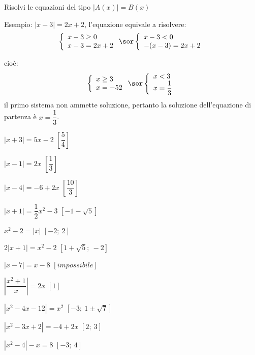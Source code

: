 \begin{esercizio}\label{ese:03.1}
\noindent Risolvi le equazioni del tipo \(|A(x)|=B(x)\)

Esempio:
\(|x-3|=2x+2\), l'equazione equivale a risolvere:
\[
\left\lbrace 
\begin{array}{l}
x-3\geq 0 \\
x-3=2x+2\\
\end{array}
\right.
\sor
\left\lbrace 
\begin{array}{l}
x-3< 0 \\
-(x-3)=2x+2\\
\end{array}
\right.
\]      

cioè:
\[
\left\lbrace 
\begin{array}{l}
x\geq 3 \\
x=-52\\
\end{array}
\right.
\sor
\left\lbrace 
\begin{array}{l}
x< 3 \\
x=\dfrac{1}{3}\\
\end{array}
\right.
\]
il primo sistema non ammette soluzione, pertanto la soluzione 
dell'equazione 
di partenza è \(    x=\dfrac{1}{3}\).
\begin{multicols}{2}
\begin{enumeratea}
\item \(\left| x+3 \right| =5x-2 \) 
\hfill \(\left[ \dfrac{5}{4}\right] \)
\item \(\left| x-1 \right| =2x \)
 \hfill \(\left[ \dfrac{1}{3}\right] \)
\item \(\left| x-4 \right| =-6+2x \)
 \hfill \(\left[ \dfrac{10}{3}\right] \)
\item \(\left| x+1 \right| =\dfrac{1}{2}x^2-3 \)
 \hfill \(\left[-1-\sqrt{5}\right] \)
\item \(x^2-2= \left| x \right| \)
 \hfill \(\left[ -2;~2\right] \)
\item \(2\left| x+1 \right| =x^2-2 \)
 \hfill \(\left[1+\sqrt{5};~-2\right] \)
\item \(\left| x-7 \right| =x-8 \)
 \hfill \(\left[ impossibile\right] \)
\item \(\left| \dfrac{x^2+1}{x} \right| =2x \)
 \hfill \(\left[ 1 \right] \)
\item \(\left| x^2-4x-12 \right| =x^2 \)
 \hfill \(\left[ -3;~1\pm \sqrt{7}\right] \)
\item \(\left| x^2-3x+2 \right| =-4+2x \)
 \hfill \(\left[ 2;~3\right] \)
\item \(\left| x^2-4 \right| -x=8 \)
 \hfill \(\left[ -3;~4\right] \)
\end{enumeratea}
\end{multicols}
\end{esercizio}

